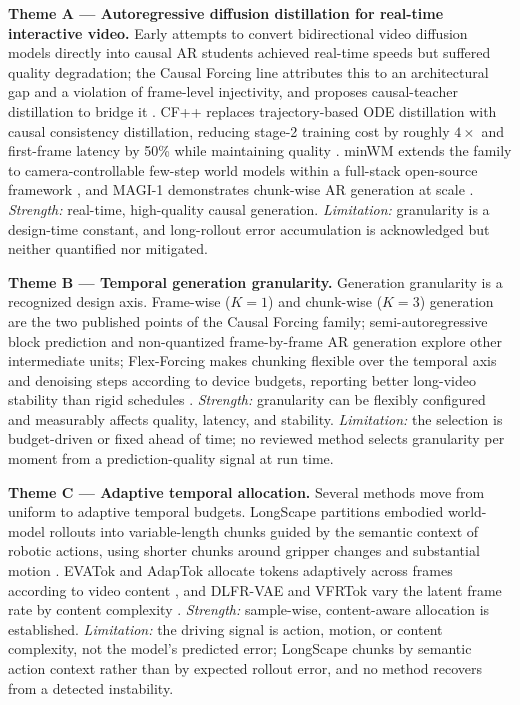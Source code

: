 \documentclass[11pt,a4paper]{article}
\begin{document}
\textbf{Theme A --- Autoregressive diffusion distillation for real-time interactive video.}
Early attempts to convert bidirectional video diffusion models directly into causal AR students achieved real-time speeds but suffered quality degradation; the Causal Forcing line attributes this to an architectural gap and a violation of frame-level injectivity, and proposes causal-teacher distillation to bridge it \parencite{zhuCausalForcingAutoregressive2026a,huangSelfForcingBridging2025}. CF++ replaces trajectory-based ODE distillation with causal consistency distillation, reducing stage-2 training cost by roughly $4\times$ and first-frame latency by 50\% while maintaining quality \parencite{zhaoCausalForcingScalable2026a}. minWM extends the family to camera-controllable few-step world models within a full-stack open-source framework \parencite{zhaoMinWMFullStackOpenSource2026a}, and MAGI-1 demonstrates chunk-wise AR generation at scale \parencite{aiMAGI1AutoregressiveVideo2025}. \emph{Strength:} real-time, high-quality causal generation. \emph{Limitation:} granularity is a design-time constant, and long-rollout error accumulation is acknowledged but neither quantified nor mitigated.

\textbf{Theme B --- Temporal generation granularity.}
Generation granularity is a recognized design axis. Frame-wise ($K=1$) and chunk-wise ($K=3$) generation are the two published points of the Causal Forcing family; semi-autoregressive block prediction \parencite{renNextBlockPrediction2025} and non-quantized frame-by-frame AR generation \parencite{dengAutoregressiveVideoGeneration2025} explore other intermediate units; Flex-Forcing makes chunking flexible over the temporal axis and denoising steps according to device budgets, reporting better long-video stability than rigid schedules \parencite{maFlexForcingUnifiedAutoregressive2026}. \emph{Strength:} granularity can be flexibly configured and measurably affects quality, latency, and stability. \emph{Limitation:} the selection is budget-driven or fixed ahead of time; no reviewed method selects granularity per moment from a prediction-quality signal at run time.

\textbf{Theme C --- Adaptive temporal allocation.}
Several methods move from uniform to adaptive temporal budgets. LongScape partitions embodied world-model rollouts into variable-length chunks guided by the semantic context of robotic actions, using shorter chunks around gripper changes and substantial motion \parencite{shangLongScapeAdvancingLongHorizon2025}. EVATok and AdapTok allocate tokens adaptively across frames according to video content \parencite{xiongEVATokAdaptiveLength2026,liLearningAdaptiveTemporally2025}, and DLFR-VAE and VFRTok vary the latent frame rate by content complexity \parencite{yuanDLFRVAEDynamicLatent2025,zhongVFRTokVariableFrame2025}. \emph{Strength:} sample-wise, content-aware allocation is established. \emph{Limitation:} the driving signal is action, motion, or content complexity, not the model's predicted error; LongScape chunks by semantic action context rather than by expected rollout error, and no method recovers from a detected instability.
\end{document}

